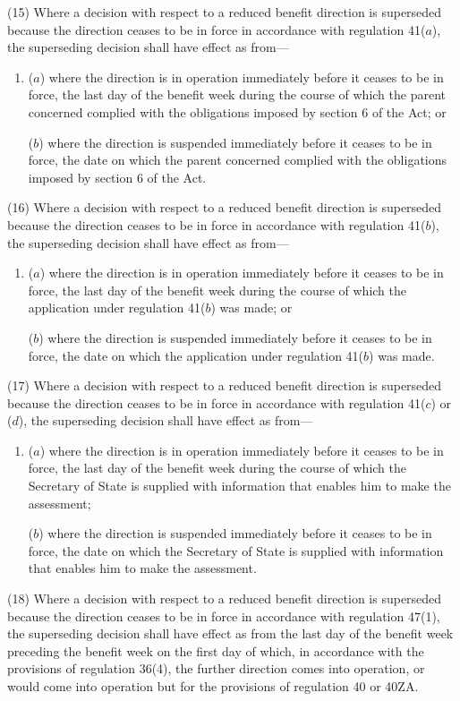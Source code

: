 \documentclass[a4paper,12pt]{article}
\begin{document}
(15) Where a decision with respect to a reduced benefit direction is superseded because the direction ceases to be in force in accordance with regulation 41($a$), the superseding decision shall have effect as from---
\begin{enumerate}\item[]
($a$) where the direction is in operation immediately before it ceases to be in force, the last day of the benefit week during the course of which the parent concerned complied with the obligations imposed by section 6 of the Act; or

($b$) where the direction is suspended immediately before it ceases to be in force, the date on which the parent concerned complied with the obligations imposed by section 6 of the Act.
\end{enumerate}

(16) Where a decision with respect to a reduced benefit direction is superseded because the direction ceases to be in force in accordance with regulation 41($b$), the superseding decision shall have effect as from---
\begin{enumerate}\item[]
($a$) where the direction is in operation immediately before it ceases to be in force, the last day of the benefit week during the course of which the application under regulation 41($b$) was made; or

($b$) where the direction is suspended immediately before it ceases to be in force, the date on which the application under regulation 41($b$) was made.
\end{enumerate}

(17) Where a decision with respect to a reduced benefit direction is superseded because the direction ceases to be in force in accordance with regulation 41($c$) or ($d$), the superseding decision shall have effect as from---
\begin{enumerate}\item[]
($a$) where the direction is in operation immediately before it ceases to be in force, the last day of the benefit week during the course of which the Secretary of State is supplied with information that enables him to make the assessment;

($b$) where the direction is suspended immediately before it ceases to be in force, the date on which the Secretary of State is supplied with information that enables him to make the assessment.
\end{enumerate}

(18) Where a decision with respect to a reduced benefit direction is superseded because the direction ceases to be in force in accordance with regulation 47(1), the superseding decision shall have effect as from the last day of the benefit week preceding the benefit week on the first day of which, in accordance with the provisions of regulation 36(4), the further direction comes into operation, or would come into operation but for the provisions of regulation 40 or 40ZA.
\end{document}

